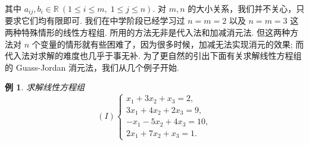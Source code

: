 \documentclass[10pt,openany]{article}
\theoremstyle{thmstyle} %
\theoremstyle{defstyle} %
\theoremstyle{prostyle} %
\newtheorem{example}[theorem]{例}
\begin{document}
其中 \( a_{ij}, b_i \in \mathbb{R} \ (1 \leq i \leq m,\; 1 \leq j \leq n) \). 对 \( m,n \) 的大小关系，我们并不关心，只要求它们均有限即可. 我们在中学阶段已经学习过 \( n=m=2 \) 以及 \( n=m=3 \) 这两种特殊情形的线性方程组. 所用的方法无非是代入法和加减消元法. 但这两种方法对 \( n \) 个变量的情形就有些困难了，因为很多时候，加减无法实现消元的效果; 而代入法对求解的难度也几乎于事无补. 为了更自然的引出下面有关求解线性方程组的 Guass-Jordan 消元法，我们从几个例子开始.

\begin{example}
	求解线性方程组
	\[
	(I) \left\{
	\begin{array}{l}
		x_1 + 3x_2 + x_3 = 2, \\
		3x_1 + 4x_2 + 2x_3 = 9, \\
		-x_1 - 5x_2 + 4x_3 = 10, \\
		2x_1 + 7x_2 + x_3 = 1.
	\end{array}
	\right.
	\]
	\label{1.1.1}
\end{example}
\end{document}

